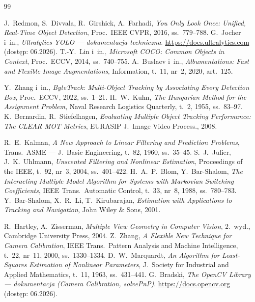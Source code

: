 \documentclass[14pt,a4paper]{extarticle}
\begin{document}
\clearpage
\renewcommand{\refname}{Bibliografia}
\begin{thebibliography}{99}

 J.~Redmon, S.~Divvala, R.~Girshick, A.~Farhadi, \emph{You Only Look Once:
  Unified, Real-Time Object Detection}, Proc.~IEEE CVPR, 2016, ss.~779--788.
 G.~Jocher i~in., \emph{Ultralytics YOLO --- dokumentacja techniczna}.
  \url{https://docs.ultralytics.com} (dostęp: 06.2026).
 T.-Y.~Lin i~in., \emph{Microsoft COCO: Common Objects in Context},
  Proc.~ECCV, 2014, ss.~740--755.
 A.~Buslaev i~in., \emph{Albumentations: Fast and Flexible Image
  Augmentations}, Information, t.~11, nr~2, 2020, art.~125.

 Y.~Zhang i~in., \emph{ByteTrack: Multi-Object Tracking by Associating
  Every Detection Box}, Proc.~ECCV, 2022, ss.~1--21.
 H.~W.~Kuhn, \emph{The Hungarian Method for the Assignment Problem},
  Naval Research Logistics Quarterly, t.~2, 1955, ss.~83--97.
 K.~Bernardin, R.~Stiefelhagen, \emph{Evaluating Multiple Object
  Tracking Performance: The CLEAR MOT Metrics}, EURASIP J.~Image Video Process., 2008.

 R.~E.~Kalman, \emph{A New Approach to Linear Filtering and Prediction
  Problems}, Trans.~ASME --- J.~Basic Engineering, t.~82, 1960, ss.~35--45.
 S.~J.~Julier, J.~K.~Uhlmann, \emph{Unscented Filtering and Nonlinear
  Estimation}, Proceedings of the IEEE, t.~92, nr~3, 2004, ss.~401--422.
 H.~A.~P.~Blom, Y.~Bar-Shalom, \emph{The Interacting Multiple Model Algorithm
  for Systems with Markovian Switching Coefficients}, IEEE Trans.~Automatic Control,
  t.~33, nr~8, 1988, ss.~780--783.
 Y.~Bar-Shalom, X.~R.~Li, T.~Kirubarajan, \emph{Estimation with
  Applications to Tracking and Navigation}, John Wiley \& Sons, 2001.

 R.~Hartley, A.~Zisserman, \emph{Multiple View Geometry in Computer Vision},
  2.~wyd., Cambridge University Press, 2004.
 Z.~Zhang, \emph{A Flexible New Technique for Camera Calibration},
  IEEE Trans.~Pattern Analysis and Machine Intelligence, t.~22, nr~11, 2000, ss.~1330--1334.
 D.~W.~Marquardt, \emph{An Algorithm for Least-Squares Estimation of Nonlinear
  Parameters}, J.~Society for Industrial and Applied Mathematics, t.~11, 1963, ss.~431--441.
 G.~Bradski, \emph{The OpenCV Library --- dokumentacja (Camera Calibration,
  solvePnP)}. \url{https://docs.opencv.org} (dostęp: 06.2026).


\end{thebibliography}
\end{document}
